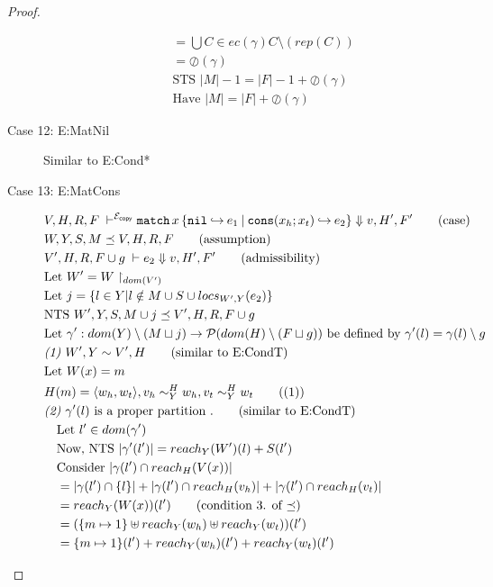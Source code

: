 \documentclass{easychair}
\newcommand{\ms}[1]{\ensuremath{\mathsf{#1}}}
\newcommand{\veq}[4]{#3 \sim^{#1}_{#2} #4}
\newcommand{\oh}[1]{\oslash(#1)}
\newcommand{\copySem}{\ensuremath{\mathcal{E}_{\ms{copy}}}}
\theoremstyle{definition}
\begin{document}
\begin{proof}
\begin{description}
\begin{align*}
		&\quad = \bigcup C \in ec(\gamma) C \setminus (rep(C))\\
		&\quad = \oh{\gamma}\\
		&\quad \text{STS } |M| - 1 = |F| - 1 + \oh{\gamma}\\
		&\quad \text{Have } |M| = |F| + \oh{\gamma} \tag{condition 5. of $\preceq$}
	\end{align*}
  \item[Case 12: E:MatNil]
  Similar to E:Cond*
  \item[Case 13: E:MatCons]
  \begin{align*}
		&V,H,R,F \; \vdash^{\copySem} \listcaseexcst{x}{e_1}{x_h}{x_t}{e_2} \Downarrow v,H',F' \tag{case}\\
		&W,Y,S,M \preceq V,H,R,F \tag{assumption}\\
		&V',H,R,F \cup g \; \vdash e_2 \Downarrow v, H',F' \tag{admissibility}\\
		&\text{Let } W' = W \restriction_{dom(V')}\\
		&\text{Let } j = \{l \in Y | l \notin M \cup S \cup locs_{W',Y}(e_2) \}\\
		&\text{NTS } W',Y,S,M \cup j \preceq V',H,R,F \cup g\\
		&\text{Let } \gamma' : dom(Y) \setminus (M \sqcup j) 
		\to \mathcal{P}(dom(H) \setminus (F \sqcup g)) \text{ be defined by } 
		\gamma'(l) = \gamma(l) \setminus g\\
		&\emph{(1) } W',Y \sim V',H \tag{similar to E:CondT}\\
		&\text{Let } W(x) = m\\
		&H(m) = \pairexcst{w_h}{w_t}, \veq{H}{Y}{v_h}{w_h},\veq{H}{Y}{v_t}{w_t} \tag{(1)} \\
		&\emph{(2) } \gamma'(l) \text{ is a proper partition }. \tag{similar to E:CondT}\\
		&\quad \text{Let } l' \in dom(\gamma')\\
		&\quad \text{Now, NTS } |\gamma'(l')| = reach_{Y}(W')(l) + S(l')\\
		&\quad \text{Consider } |\gamma(l') \cap reach_H(V(x))|\\
		&\quad = |\gamma(l') \cap \{l\}| + |\gamma(l') \cap reach_H(v_h)| 
			+ |\gamma(l') \cap reach_H(v_t)|\\ 
		&\quad = reach_Y(W(x))(l') \tag{condition 3. of $\preceq$}\\
		&\quad = (\{m \mapsto 1\} \uplus reach_Y(w_h) \uplus reach_Y(w_t))(l')\\
		&\quad = \{m \mapsto 1\}(l') + reach_Y(w_h)(l') + reach_Y(w_t)(l')\\

\end{align*}
\end{description}
\end{proof}
\end{document}

